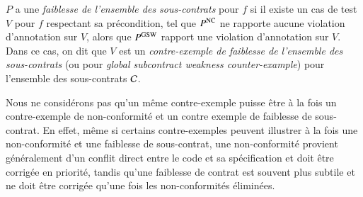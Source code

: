 \begin{figure}[tb]
  \begin{minipage}{0.5\columnwidth}
    
  \end{minipage}
  \begin{minipage}{0.5\columnwidth}
    
  \end{minipage}
\end{figure}

\begin{definition} 
  \label{def:GSW}
  $P$ a une \emph{faiblesse de l'ensemble des sous-contrats} pour $f$  si il
  existe un cas de test $V$ pour $f$ respectant sa précondition, tel que
  $P^{\mathrm{NC}}$ ne rapporte aucune violation d'annotation sur $V$, alors que
  $P^{\mathrm{GSW}}$ rapport une violation d'annotation sur $V$.
  Dans ce cas, on dit que $V$ est un
  \emph{contre-exemple de faiblesse de l'ensemble des sous-contrats} (ou \GSWCE
  pour {\em global subcontract weakness counter-example}) pour l'ensemble des
  sous-contrats ${\mathcal{C}}$.
\end{definition}

Nous ne considérons pas qu'un même contre-exemple puisse être à la fois un
contre-exemple de non-conformité et un contre exemple de faiblesse de
sous-contrat.
En effet, même si certains contre-exemples peuvent illustrer à la fois une
non-conformité et une faiblesse de sous-contrat, une non-conformité provient
généralement d'un conflit direct entre le code et sa spécification et doit être
corrigée en priorité, tandis qu'une faiblesse de contrat est souvent plus
subtile et ne doit être corrigée qu'une fois les non-conformités éliminées.

